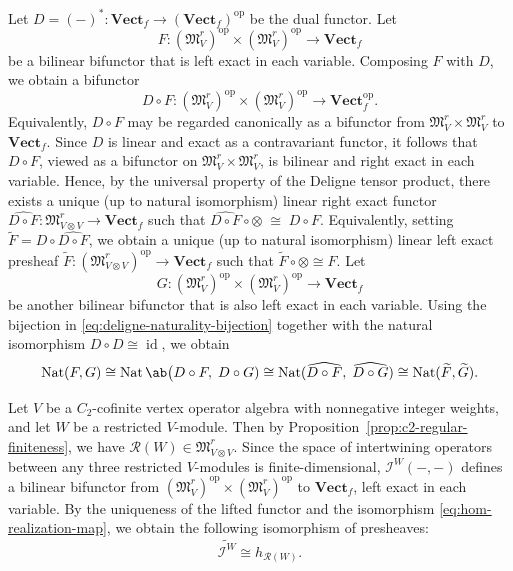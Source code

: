 \documentclass[12pt, english]{article}
\numberwithin{equation}{section}
\DeclareMathOperator{\id}{id}
\DeclareMathOperator{\opp}{op}
\DeclareMathOperator{\Nat}{Nat}
\theoremstyle{plain}
\theoremstyle{definition}
\theoremstyle{remark}
\begin{document}
	Let $D = (-)^* \colon \mathbf{Vect}_f \to (\mathbf{Vect}_f)^{\opp} $ be the dual functor.
	Let
	\[
	F \colon (\mathfrak{M}^r_V)^{\opp} \times (\mathfrak{M}^r_V)^{\opp} \longrightarrow
	\mathbf{Vect}_f
	\]
	be a bilinear bifunctor that is left exact in each variable.
	Composing $F$ with $D$, we obtain a bifunctor
	\[
	D \circ F \colon (\mathfrak{M}^r_V)^{\opp} \times (\mathfrak{M}^r_V)^{\opp}
	\longrightarrow \mathbf{Vect}_f^{\opp}.
	\]
	Equivalently, $D \circ F$  may be regarded canonically as a bifunctor from $\mathfrak{M}^r_V \times \mathfrak{M}^r_V$ to $\mathbf{Vect}_f$.
	Since $D$ is linear and exact as a contravariant functor,
	it follows that $D \circ F$,  viewed as a bifunctor on
	$ \mathfrak{M}^r_V \times \mathfrak{M}^r_V$, is bilinear and right exact in each variable.
	Hence, by the universal property of the Deligne tensor product,
	there exists a unique (up to natural isomorphism) linear right exact functor
	$\widehat{D\circ F} \colon \mathfrak{M}^r_{V \otimes V} \to \mathbf{Vect}_f$
	such that
	$ \widehat{D\circ F} \circ \otimes \; \cong \; D \circ F.$
	Equivalently, setting $ \widetilde{F} = D\circ \widehat{D\circ F}$, we obtain a unique (up to natural isomorphism) linear left exact presheaf
	$ \widetilde{F}  \colon (\mathfrak{M}^r_{V \otimes V})^{\opp} \to \mathbf{Vect}_f$
	such that
	$ \widetilde{F} \circ \otimes \cong F$.
	Let
	\[
	G \colon (\mathfrak{M}^r_V)^{\opp} \times (\mathfrak{M}^r_V)^{\opp} \longrightarrow
	\mathbf{Vect}_f
	\]
	be another bilinear bifunctor that is also left exact in each variable.
	Using the bijection in \eqref{eq:deligne-naturality-bijection} together with the natural
	isomorphism $D\circ D \cong \id$, we obtain
	\[
	\Nat(F, G) \cong \Nat \ab\big(D \circ F, \; D \circ G) \cong
	\Nat(\widehat{D\circ F}, \; \widehat{D\circ G}) \cong \Nat(\widetilde{F}, \widetilde{G}).
	\]
	
	Let $V$ be a $C_2$-cofinite vertex operator algebra with nonnegative integer weights,
	and let $W$ be a restricted $V$-module.
	Then by Proposition~\ref{prop:c2-regular-finiteness}, we have $\mathcal{R}(W) \in \mathfrak{M}^r_{V \otimes V}$.
	Since the space of intertwining operators between any three restricted $V$-modules is finite-dimensional, $\mathcal{I}^W(-, -)$ defines a bilinear bifunctor from $(\mathfrak{M}^r_V)^{\opp} \times (\mathfrak{M}^r_V)^{\opp}$ to $\mathbf{Vect}_f$, left exact in each variable.
	By the uniqueness of the lifted functor and the isomorphism \eqref{eq:hom-realization-map}, we obtain the following isomorphism of presheaves:
	\[
	\widetilde{\mathcal{I}^W} \cong h_{\mathcal{R}(W)}.
	\]
	
\end{document}

